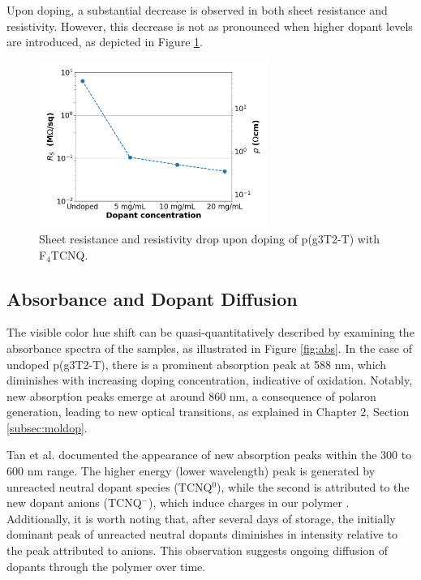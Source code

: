 Upon doping, a substantial decrease is observed in both sheet resistance and resistivity. However, this decrease is not as pronounced when higher dopant levels are introduced, as depicted in Figure \ref{fig:rho}. %

\begin{figure}[ht]
  \centering
  \includegraphics[width=7.5cm]{Images/pdf/resist.pdf}
  \caption[Sheet resistance and resistivity drop upon doping]{Sheet resistance and resistivity drop upon doping of p(g3T2-T) with F$_{4}$TCNQ. %
  }
  \label{fig:rho}
\end{figure}

\subsection{Absorbance and Dopant Diffusion}
The visible color hue shift can be quasi-quantitatively described by examining the absorbance spectra of the samples, as illustrated in Figure \ref{fig:abs}. In the case of undoped p(g3T2-T), there is a prominent absorption peak at 588 nm, which diminishes with increasing doping concentration, indicative of oxidation. Notably, new absorption peaks emerge at around 860 nm, a consequence of polaron generation, leading to new optical transitions, as explained in Chapter 2, Section \ref{subsec:moldop}. 

Tan et al. documented the appearance of new absorption peaks within the 300 to 600 nm range. The higher energy (lower wavelength) peak is generated by unreacted neutral dopant species (TCNQ$^{0}$), while the second is attributed to the new dopant anions (TCNQ$^{-}$), which induce charges in our polymer \cite{tanTuningOrganicElectrochemical2022}. Additionally, it is worth noting that, after several days of storage, the initially dominant peak of unreacted neutral dopants diminishes in intensity relative to the peak attributed to anions. This observation suggests ongoing diffusion of dopants through the polymer over time. 

